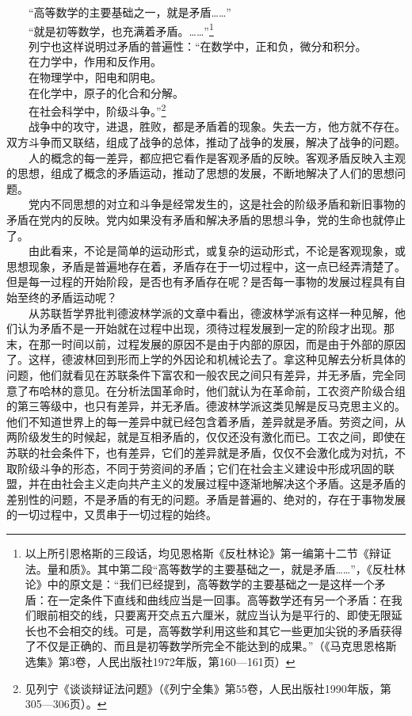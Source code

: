 \documentclass[cn,11pt,chinese]{elegantbook}
\begin{document}
　　“高等数学的主要基础之一，就是矛盾……”\\
　　“就是初等数学，也充满着矛盾。……”\footnote[8]{ 以上所引恩格斯的三段话，均见恩格斯《反杜林论》第一编第十二节《辩证法。量和质》。其中第二段“高等数学的主要基础之一，就是矛盾……”，《反杜林论》中的原文是：“我们已经提到，高等数学的主要基础之一是这样一个矛盾：在一定条件下直线和曲线应当是一回事。高等数学还有另一个矛盾：在我们眼前相交的线，只要离开交点五六厘米，就应当认为是平行的、即使无限延长也不会相交的线。可是，高等数学利用这些和其它一些更加尖锐的矛盾获得了不仅是正确的、而且是初等数学所完全不能达到的成果。”（《马克思恩格斯选集》第3卷，人民出版社1972年版，第160—161页）}\\
　　列宁也这样说明过矛盾的普遍性：“在数学中，正和负，微分和积分。\\
　　在力学中，作用和反作用。\\
　　在物理学中，阳电和阴电。\\
　　在化学中，原子的化合和分解。\\
　　在社会科学中，阶级斗争。”\footnote[9]{ 见列宁《谈谈辩证法问题》（《列宁全集》第55卷，人民出版社1990年版，第305—306页）。}\\
　　战争中的攻守，进退，胜败，都是矛盾着的现象。失去一方，他方就不存在。双方斗争而又联结，组成了战争的总体，推动了战争的发展，解决了战争的问题。\\
　　人的概念的每一差异，都应把它看作是客观矛盾的反映。客观矛盾反映入主观的思想，组成了概念的矛盾运动，推动了思想的发展，不断地解决了人们的思想问题。\\
　　党内不同思想的对立和斗争是经常发生的，这是社会的阶级矛盾和新旧事物的矛盾在党内的反映。党内如果没有矛盾和解决矛盾的思想斗争，党的生命也就停止了。\\
　　由此看来，不论是简单的运动形式，或复杂的运动形式，不论是客观现象，或思想现象，矛盾是普遍地存在着，矛盾存在于一切过程中，这一点已经弄清楚了。但是每一过程的开始阶段，是否也有矛盾存在呢？是否每一事物的发展过程具有自始至终的矛盾运动呢？\\
　　从苏联哲学界批判德波林学派的文章中看出，德波林学派有这样一种见解，他们认为矛盾不是一开始就在过程中出现，须待过程发展到一定的阶段才出现。那末，在那一时间以前，过程发展的原因不是由于内部的原因，而是由于外部的原因了。这样，德波林回到形而上学的外因论和机械论去了。拿这种见解去分析具体的问题，他们就看见在苏联条件下富农和一般农民之间只有差异，并无矛盾，完全同意了布哈林的意见。在分析法国革命时，他们就认为在革命前，工农资产阶级合组的第三等级中，也只有差异，并无矛盾。德波林学派这类见解是反马克思主义的。他们不知道世界上的每一差异中就已经包含着矛盾，差异就是矛盾。劳资之间，从两阶级发生的时候起，就是互相矛盾的，仅仅还没有激化而已。工农之间，即使在苏联的社会条件下，也有差异，它们的差异就是矛盾，仅仅不会激化成为对抗，不取阶级斗争的形态，不同于劳资间的矛盾；它们在社会主义建设中形成巩固的联盟，并在由社会主义走向共产主义的发展过程中逐渐地解决这个矛盾。这是矛盾的差别性的问题，不是矛盾的有无的问题。矛盾是普遍的、绝对的，存在于事物发展的一切过程中，又贯串于一切过程的始终。\\
\end{document}
